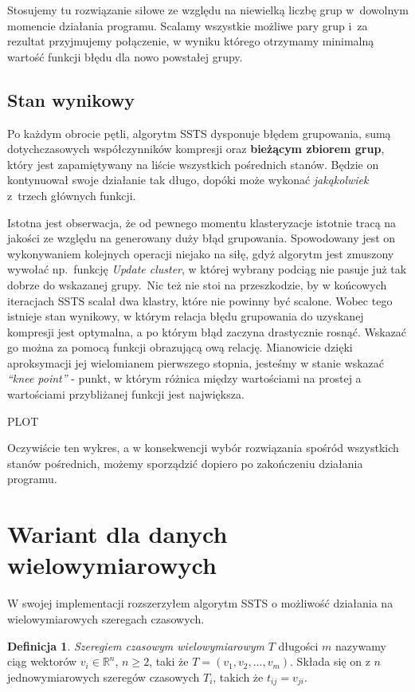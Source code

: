 \documentclass{article}
\theoremstyle{definition}
\newtheorem{defn}{Definicja}
\begin{document}
Stosujemy tu rozwiązanie siłowe ze względu na niewielką liczbę grup w~dowolnym momencie działania programu.
Scalamy wszystkie możliwe pary grup i~za rezultat przyjmujemy połączenie, w wyniku którego otrzymamy minimalną wartość funkcji błędu dla nowo powstałej grupy.


\subsection{Stan wynikowy}
Po każdym obrocie pętli, algorytm SSTS dysponuje 
błędem grupowania, sumą dotychczasowych współczynników kompresji oraz \textbf{bieżącym zbiorem grup}, który jest zapamiętywany na liście wszystkich pośrednich stanów.
Będzie on kontynuował swoje działanie tak długo, dopóki może wykonać \textit{jakąkolwiek} z~trzech głównych funkcji.

Istotna jest obserwacja, że od pewnego momentu klasteryzacje istotnie tracą na jakości ze względu na generowany duży błąd grupowania.
Spowodowany jest on wykonywaniem kolejnych operacji niejako na siłę, gdyż algorytm jest zmuszony wywołać np.~funkcję \textit{Update cluster},
w której wybrany podciąg nie pasuje już tak dobrze do wskazanej grupy.~Nic też nie stoi na przeszkodzie, by w końcowych iteracjach SSTS scalał dwa klastry, które nie powinny być scalone.
Wobec tego istnieje stan wynikowy, w którym relacja błędu grupowania do uzyskanej kompresji jest optymalna, a po którym błąd zaczyna 
drastycznie rosnąć. Wskazać go można za pomocą funkcji obrazującą ową relację.
Mianowicie dzięki aproksymacji jej wielomianem pierwszego stopnia, jesteśmy w stanie wskazać \textit{``knee point''} - punkt, 
w którym różnica między wartościami na prostej a wartościami przybliżanej funkcji jest największa.

PLOT%

Oczywiście ten wykres, a w konsekwencji wybór rozwiązania spośród wszystkich stanów pośrednich, możemy sporządzić dopiero po 
zakończeniu działania programu.

\section{Wariant dla danych wielowymiarowych}

W swojej implementacji rozszerzyłem algorytm SSTS o możliwość działania na wielowymiarowych szeregach czasowych.

\begin{defn}
\textit{Szeregiem czasowym wielowymiarowym} ${T}$ długości $m$ nazywamy ciąg wektorów $v_{i} \in \mathbb{R}^{n}$, $n \geqslant 2$, taki że 
${T} = (v_{1}, v_{2}, ..., v_{m})$.
Składa się on z $n$ jednowymiarowych szeregów czasowych $T_{i}$, takich że $t_{ij} = v_{ji}$.
\end{defn}
\end{document}

